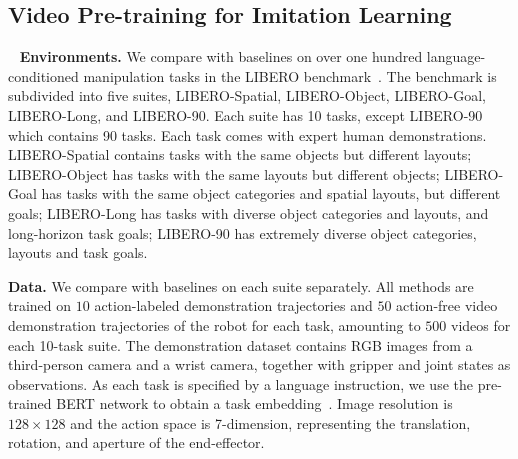 \subsection{Video Pre-training for Imitation Learning}~\label{sec:video_bc}
\noindent\textbf{Environments.} We compare with baselines on over one hundred language-conditioned manipulation tasks in the LIBERO benchmark~\cite{liu2023libero}. The benchmark is subdivided into five suites, LIBERO-Spatial, LIBERO-Object, LIBERO-Goal, LIBERO-Long, and LIBERO-90. Each suite has 10 tasks, except LIBERO-90 which contains 90 tasks. Each task comes with expert human demonstrations. LIBERO-Spatial contains tasks with the same objects but different layouts; LIBERO-Object has tasks with the same layouts but different objects; LIBERO-Goal has tasks with the same object categories and spatial layouts, but different goals; LIBERO-Long has tasks with diverse object categories and layouts, and long-horizon task goals; LIBERO-90 has extremely diverse object categories, layouts and task goals.

\textbf{Data.} We compare with baselines on each suite separately. All methods are trained on $10$ action-labeled demonstration trajectories and $50$ action-free video demonstration trajectories of the robot for each task, amounting to $500$ videos for each 10-task suite. The demonstration dataset contains RGB images from a third-person camera and a wrist camera, together with gripper and joint states as observations. As each task is specified by a language instruction, we use the pre-trained BERT network to obtain a task embedding~\cite{devlin2019-bert}. Image resolution is $128\times128$ and the action space is 7-dimension, representing the translation, rotation, and aperture of the end-effector. 

